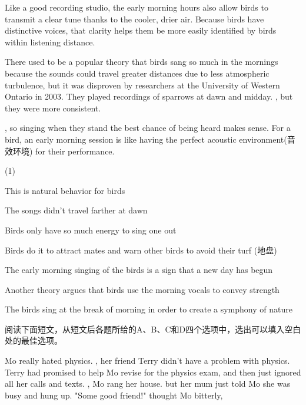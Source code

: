 \documentclass{英语试卷}
\begin{document}
\par Like a good recording studio, the early morning hours also allow birds to transmit a clear tune thanks to the cooler, drier air. Because birds have distinctive voices, that clarity helps them be more easily identified by birds within listening distance.\par
\par There used to be a popular theory that birds sang so much in the mornings because the sounds could travel greater distances due to less atmospheric turbulence, but it was disproven by researchers at the University of Western Ontario in 2003. They played recordings of sparrows at dawn and midday. , but they were more consistent.\par
\par {}, so singing when they stand the best chance of being heard makes sense. For a bird, an early morning session is like having the perfect acoustic environment(音效环境) for their performance.\par
\begin{choices}(1)
  \item This is natural behavior for birds
  \item The songs didn't travel farther at dawn
  \item Birds only have so much energy to sing one out
  \item Birds do it to attract mates and warn other birds to avoid their turf (地盘)
  \item The early morning singing of the birds is a sign that a new day has begun
  \item Another theory argues that birds use the morning vocals to convey strength
  \item The birds sing at the break of morning in order to create a symphony of nature
\end{choices}
\par 阅读下面短文，从短文后各题所给的A、B、C和D四个选项中，选出可以填入空白处的最佳选项。\par
\par Mo really hated physics. , her friend Terry didn't have a problem with physics. Terry had promised to help Mo revise for the physics exam, and then just ignored all her calls and texts. , Mo rang her house. but her mum just told Mo she was busy and hung up. "Some good friend!" thought Mo bitterly,\par
\end{document}
